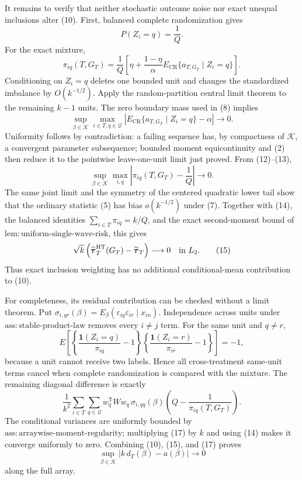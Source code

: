 It remains to verify that neither stochastic outcome noise nor exact unequal inclusions alter (10).  First, balanced complete randomization gives
\[
P(Z_i=q)=\frac1Q.
\tag{11}
\]
For the exact mixture,
\[
\pi_{iq}(T,G_T)
=\frac1Q\left[
\eta+\frac{1-\eta}{\alpha}
E_{\mathrm{CR}}\{a_{T,G_T}\mid Z_i=q\}
\right].
\tag{12}
\]
Conditioning on \(Z_i=q\) deletes one bounded unit and changes the standardized imbalance by \(O(k^{-1/2})\).  Apply the random-partition central limit theorem to the remaining \(k-1\) units.  The zero boundary mass used in (8) implies
\[
\sup_{\beta\in\mathcal K}\max_{i\in T,q\in\mathcal Q}
\left|
E_{\mathrm{CR}}\{a_{T,G_T}\mid Z_i=q\}-\alpha
\right|\longrightarrow0.
\tag{13}
\]
Uniformity follows by contradiction: a failing sequence has, by compactness of \(\mathcal K\), a convergent parameter subsequence; bounded moment equicontinuity and (2) then reduce it to the pointwise leave-one-unit limit just proved.  From (12)--(13),
\[
\sup_{\beta\in\mathcal K}\max_{i,q}
\left|\pi_{iq}(T,G_T)-\frac1Q\right|\longrightarrow0.
\tag{14}
\]
The same joint limit and the symmetry of the centered quadratic lower tail show that the ordinary statistic (5) has bias \(o(k^{-1/2})\) under (7).  Together with (14), the balanced identities
\(\sum_{i\in T}\pi_{iq}=k/Q\), and the exact second-moment bound of
\(\mathrm{lem{:}uniform\text{-}single\text{-}wave\text{-}risk}\), this gives
\[
\sqrt{k}\left(
\widehat{\boldsymbol\tau}^{\mathrm{HT}}_T(G_T)
-\widetilde{\boldsymbol\tau}_T
\right)\longrightarrow0
\quad\hbox{in }L_2.
\tag{15}
\]
Thus exact inclusion weighting has no additional conditional-mean contribution to (10).

For completeness, its residual contribution can be checked without a limit theorem.  Put
\(\sigma_{i,qr}(\beta)=E_\beta(\varepsilon_{iq}\varepsilon_{ir}\mid x_{in})\).
Independence across units under \(\mathrm{ass{:}stable\text{-}product\text{-}law}\) removes every \(i\ne j\) term.  For the same unit and \(q\ne r\),
\[
E\left[
\left\{\frac{\mathbf 1(Z_i=q)}{\pi_{iq}}-1\right\}
\left\{\frac{\mathbf 1(Z_i=r)}{\pi_{ir}}-1\right\}
\right]=-1,
\tag{16}
\]
because a unit cannot receive two labels.  Hence all cross-treatment same-unit terms cancel when complete randomization is compared with the mixture.  The remaining diagonal difference is exactly
\[
\frac1{k^2}\sum_{i\in T}\sum_{q\in\mathcal Q}
w_q^{\mathsf T}Ww_q\,\sigma_{i,qq}(\beta)
\left(Q-\frac1{\pi_{iq}(T,G_T)}\right).
\tag{17}
\]
The conditional variances are uniformly bounded by
\(\mathrm{ass{:}arraywise\text{-}moment\text{-}regularity}\); multiplying (17) by \(k\) and using (14) makes it converge uniformly to zero.  Combining (10), (15), and (17) proves
\[
\sup_{\beta\in\mathcal K}|k\,d_T(\beta)-a(\beta)|\longrightarrow0
\tag{18}
\]
along the full array.


